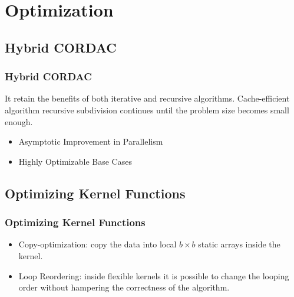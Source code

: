 \section{Optimization}

\subsection{Hybrid CORDAC}
\begin{frame}
    \frametitle{Hybrid CORDAC}
    	It retain the benefits of both iterative and recursive algorithms.
		Cache-efficient algorithm recursive subdivision continues until 
		the problem size becomes small enough.
	\begin{itemize}
		\item Asymptotic Improvement in Parallelism
		\item Highly Optimizable Base Cases
	\end{itemize}
\end{frame}

\subsection{Optimizing Kernel Functions}
\begin{frame}
    \frametitle{Optimizing Kernel Functions}
	\begin{itemize}
		\item Copy-optimization: copy the data into local $b \times b$ 
			static arrays inside the kernel.
		\item Loop Reordering: inside flexible kernels it is possible to change
			the looping order without hampering the correctness of the algorithm.
	\end{itemize}
\end{frame}

